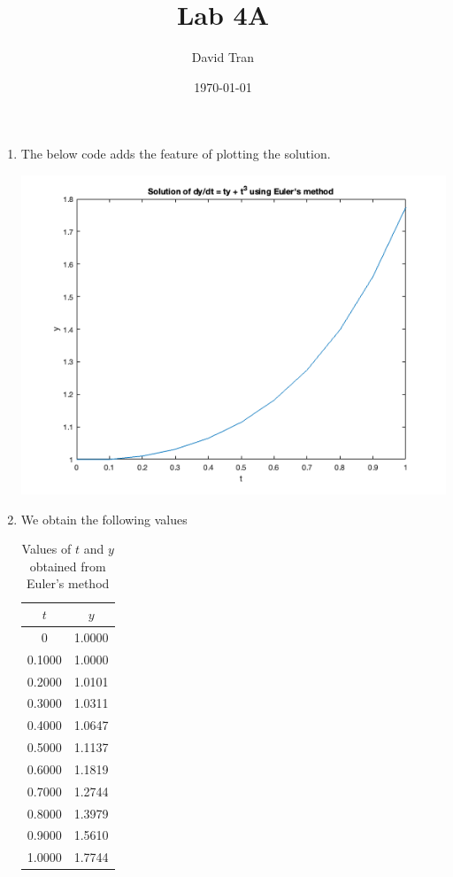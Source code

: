 \documentclass[11pt]{article}
\title{Lab 4A}
\author{David Tran}
\date{\today}
\begin{document}
\maketitle

\begin{enumerate}
  \item The below code adds the feature of plotting the solution.
  
  

  

  \includegraphics*[width=\linewidth]{euler_method.png}

  \item We obtain the following values
  \begin{table}[htbp]
    \centering
    \begin{tabular}{|c|c|}
    \hline
    $t$ & $y$ \\
    \hline
    0 & 1.0000 \\
    0.1000 & 1.0000 \\
    0.2000 & 1.0101 \\
    0.3000 & 1.0311 \\
    0.4000 & 1.0647 \\
    0.5000 & 1.1137 \\
    0.6000 & 1.1819 \\
    0.7000 & 1.2744 \\
    0.8000 & 1.3979 \\
    0.9000 & 1.5610 \\
    1.0000 & 1.7744 \\
    \hline
    \end{tabular}
    \caption{Values of $t$ and $y$ obtained from Euler's method}
    \label{tab:euler_values}
    \end{table}


\end{enumerate}
\end{document}
